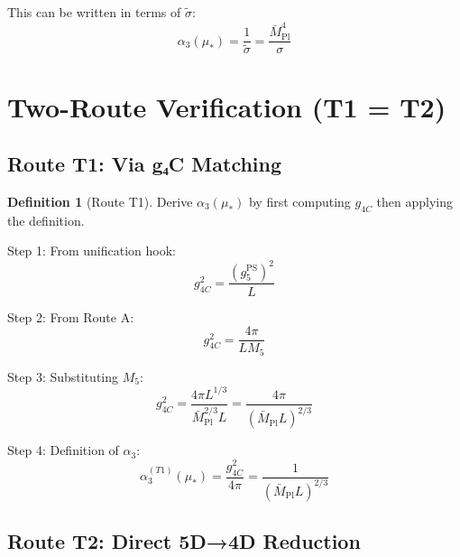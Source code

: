 \documentclass[11pt,a4paper]{article}
\theoremstyle{definition}
\newtheorem{definition}{Definition}[section]
\begin{document}
This can be written in terms of $\tilde{\sigma}$:
\begin{equation}
\label{eq:alpha3-canonical-final}
\boxed{\alpha_3(\mu_*) = \frac{1}{\tilde{\sigma}} = \frac{\bar{M}_{\text{Pl}}^4}{\sigma}}
\end{equation}

\section{Two-Route Verification (T1 = T2)}
\label{sec:two-route}

\subsection{Route T1: Via g₄C Matching}
\label{subsec:route-t1}

\begin{definition}[Route T1]
Derive $\alpha_3(\mu_*)$ by first computing $g_{4C}$ then applying the definition.
\end{definition}

Step 1: From unification hook:
\begin{equation}
\label{eq:t1-step1}
g_{4C}^2 = \frac{(g_5^{\text{PS}})^2}{L}
\end{equation}

Step 2: From Route A:
\begin{equation}
\label{eq:t1-step2}
g_{4C}^2 = \frac{4\pi}{L M_5}
\end{equation}

Step 3: Substituting $M_5$:
\begin{equation}
\label{eq:t1-step3}
g_{4C}^2 = \frac{4\pi L^{1/3}}{\bar{M}_{\text{Pl}}^{2/3} L} = \frac{4\pi}{(\bar{M}_{\text{Pl}} L)^{2/3}}
\end{equation}

Step 4: Definition of $\alpha_3$:
\begin{equation}
\label{eq:t1-step4}
\alpha_3^{(T1)}(\mu_*) = \frac{g_{4C}^2}{4\pi} = \frac{1}{(\bar{M}_{\text{Pl}} L)^{2/3}}
\end{equation}

\subsection{Route T2: Direct 5D→4D Reduction}
\label{subsec:route-t2}
\end{document}
